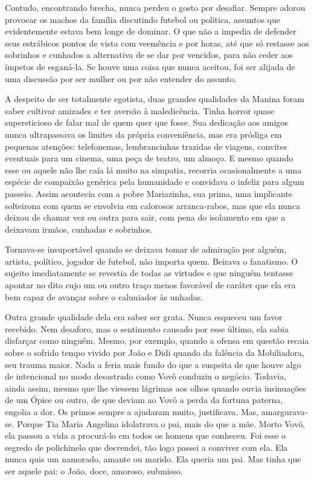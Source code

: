 Contudo, encontrando brecha, nunca perdeu o gosto por desafiar.
Sempre adorou provocar os machos da família discutindo futebol ou política, assuntos que evidentemente estava bem longe de dominar.
O que não a impedia de defender seus estrábicos pontos de vista com veemência e por horas, até que só restasse aos sobrinhos e cunhados a alternativa de se dar por vencidos, para não ceder aos ímpetos de esganá-la.
Se houve uma coisa que nunca aceitou, foi ser alijada de uma discussão por ser mulher ou por não entender do assunto.


A despeito de ser totalmente egotista, duas grandes qualidades da Manina foram saber cultivar amizades e ter aversão à maledicência.
Tinha horror quase supersticioso de falar mal de quem quer que fosse.
Sua dedicação aos amigos nunca ultrapassava os limites da própria conveniência, mas era pródiga em pequenas atenções: telefonemas, lembrancinhas trazidas de viagens, convites eventuais para um cinema, uma peça de teatro, um almoço.
E mesmo quando esse ou aquele não lhe caía lá muito na simpatia, recorria ocasionalmente a uma espécie de compaixão genérica pela humanidade e convidava o infeliz para algum passeio.
Assim acontecia com a pobre Mariazinha, sua prima, uma implicante solteirona com quem se envolvia em calorosos arranca-rabos, mas que ela nunca deixou de chamar vez ou outra para sair, com pena do isolamento em que a deixavam irmãos, cunhadas e sobrinhos.

Tornava-se insuportável quando se deixava tomar de admiração por alguém, artista, político, jogador de futebol, não importa quem.
Beirava o fanatismo.
O sujeito imediatamente se revestia de todas as virtudes e que ninguém tentasse apontar no dito cujo um ou outro traço menos favorável de caráter que ela era bem capaz de avançar sobre o caluniador às unhadas.

Outra grande qualidade dela era saber ser grata.
Nunca esqueceu um favor recebido.
Nem desaforo, mas o sentimento causado por esse último, ela sabia disfarçar como ninguém.
Mesmo, por exemplo, quando a ofensa em questão recaia sobre o sofrido tempo vivido por João e Didi quando da falência da Mobiliadora, seu trauma maior.
Nada a feria mais fundo do que a suspeita de que houve algo de intencional no modo desastrado como Vovô conduziu o negócio.
Todavia, ainda assim, mesmo que lhe viessem lágrimas aos olhos quando ouvia insinuações de um Ópice ou outro, de que deviam ao Vovô a perda da fortuna paterna, engolia a dor.
Os primos sempre a ajudaram muito, justificava.
Mas, amargurava-se.
Porque Tia Maria Angelina idolatrava o pai, mais do que a mãe.
Morto Vovô, ela passou a vida a procurá-lo em todos os homens que conheceu.
Foi esse o segredo de polichinelo que desvendei, tão logo passei a conviver com ela.
Ela nunca quis um namorado, amante ou marido.
Ela queria um pai.
Mas tinha que ser aquele pai: o João, doce, amoroso, submisso.

